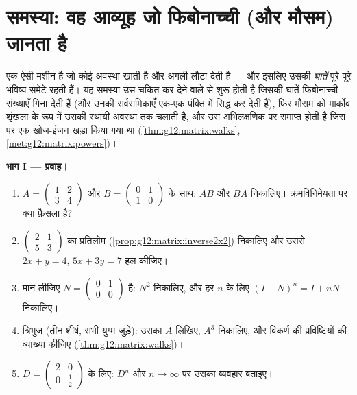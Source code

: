 \section{समस्या: वह आव्यूह जो फिबोनाच्ची (और मौसम) जानता है}

\begin{problem}
\label{pb:g12:matrix:1}
 एक ऐसी मशीन है जो कोई अवस्था खाती है और अगली लौटा देती है --- और इसलिए
उसकी \emph{घातें} पूरे-पूरे भविष्य समेटे रहती हैं। यह समस्या उस चकित कर देने
वाले  से शुरू होती है जिसकी घातें फिबोनाच्ची संख्याएँ गिना देती हैं
(और उनकी सर्वसमिकाएँ एक-एक पंक्ति में सिद्ध कर देती हैं), फिर मौसम को मार्कोव
शृंखला के रूप में उसकी स्थायी अवस्था तक चलाती है, और उस अभिलक्षणिक  पर
समाप्त होती है जिस पर एक खोज-इंजन खड़ा किया गया था (\cref{thm:g12:matrix:walks}, \cref{met:g12:matrix:powers})।

\medskip
\noindent\textbf{भाग I --- प्रवाह।}
\begin{enumerate}
  \item $A = \begin{pmatrix} 1 & 2\\ 3 & 4\end{pmatrix}$ और $B = \begin{pmatrix} 0 & 1\\ 1 & 0\end{pmatrix}$ के साथ: $AB$ और $BA$ निकालिए। क्रमविनिमेयता पर क्या
        फ़ैसला है?
  \item $\begin{pmatrix} 2 & 1\\ 5 & 3\end{pmatrix}$ का प्रतिलोम (\cref{prop:g12:matrix:inverse2x2}) निकालिए और उससे $2x + y = 4$, $5x + 3y = 7$ हल कीजिए।
  \item मान लीजिए $N = \begin{pmatrix} 0 & 1\\ 0 & 0\end{pmatrix}$ है: $N^2$ निकालिए, और हर $n$ के लिए $(I + N)^n = I + nN$ निकालिए।
  \item त्रिभुज  (तीन शीर्ष, सभी युग्म जुड़े): उसका 
        $A$ लिखिए, $A^3$ निकालिए, और विकर्ण की प्रविष्टियों की व्याख्या
        कीजिए (\cref{thm:g12:matrix:walks})।
  \item $D = \begin{pmatrix} 2 & 0\\ 0 & \frac12
        \end{pmatrix}$ के लिए: $D^n$ और $n \to \infty$ पर उसका व्यवहार बताइए।
\end{enumerate}


\end{problem}
